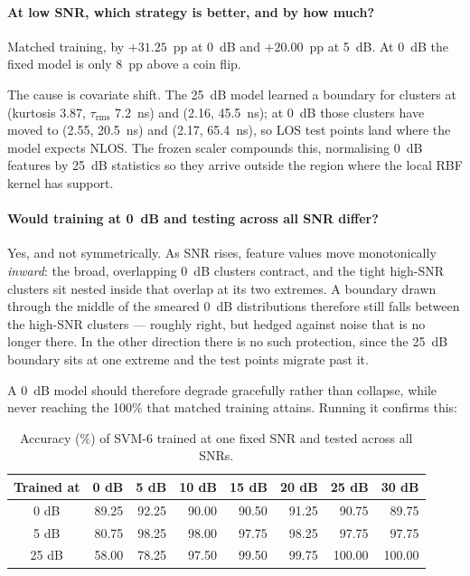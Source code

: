 \documentclass[11pt,a4paper]{article}
\begin{document}
\paragraph{At low SNR, which strategy is better, and by how much?}
Matched training, by $+31.25$~pp at 0~dB and $+20.00$~pp at 5~dB. At 0~dB the fixed model is
only 8~pp above a coin flip.

The cause is covariate shift. The 25~dB model learned a boundary for clusters at
(kurtosis 3.87, $\tau_{\mathrm{rms}}$ 7.2~ns) and (2.16, 45.5~ns); at 0~dB those clusters have
moved to (2.55, 20.5~ns) and (2.17, 65.4~ns), so LOS test points land where the model expects
NLOS. The frozen scaler compounds this, normalising 0~dB features by 25~dB statistics so they
arrive outside the region where the local RBF kernel has support.

\paragraph{Would training at 0~dB and testing across all SNR differ?}
Yes, and not symmetrically. As SNR rises, feature values move monotonically \emph{inward}: the
broad, overlapping 0~dB clusters contract, and the tight high-SNR clusters sit nested inside
that overlap at its two extremes. A boundary drawn through the middle of the smeared 0~dB
distributions therefore still falls between the high-SNR clusters --- roughly right, but hedged
against noise that is no longer there. In the other direction there is no such protection,
since the 25~dB boundary sits at one extreme and the test points migrate past it.

A 0~dB model should therefore degrade gracefully rather than collapse, while never reaching the
100\% that matched training attains. Running it confirms this:

\begin{table}[H]
\centering
\caption{Accuracy (\%) of SVM-6 trained at one fixed SNR and tested across all SNRs.}
\label{tab:q1c2}
\begin{tabular}{crrrrrrr}
\toprule
Trained at & 0 dB & 5 dB & 10 dB & 15 dB & 20 dB & 25 dB & 30 dB \\
\midrule
 0 dB & 89.25 & 92.25 & 90.00 & 90.50 & 91.25 &  90.75 &  89.75 \\
 5 dB & 80.75 & 98.25 & 98.00 & 97.75 & 98.25 &  97.75 &  97.75 \\
25 dB & 58.00 & 78.25 & 97.50 & 99.50 & 99.75 & 100.00 & 100.00 \\
\bottomrule
\end{tabular}
\end{table}
\end{document}
